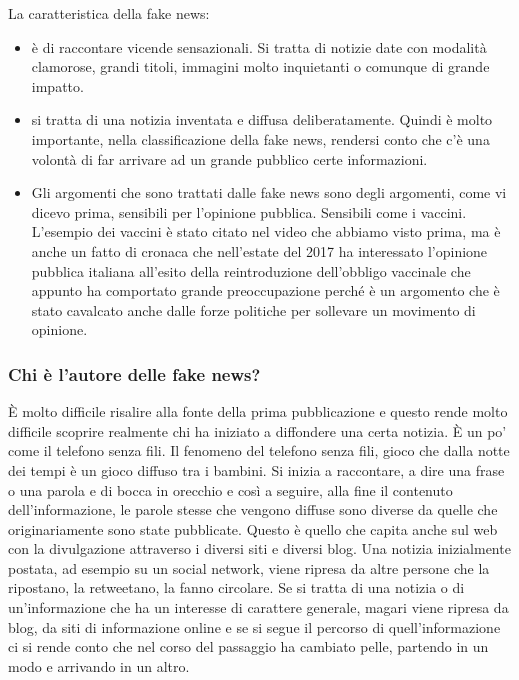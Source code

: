 La caratteristica della fake news:
\begin{itemize}
    \item è di raccontare vicende sensazionali. Si tratta di notizie date con modalità clamorose, grandi titoli, immagini molto inquietanti o comunque di grande impatto. 
    \item si tratta di una notizia inventata e diffusa deliberatamente. Quindi è molto importante, nella classificazione della fake news, rendersi conto che c'è una volontà di far arrivare ad un grande pubblico certe informazioni.
    \item Gli argomenti che sono trattati dalle fake news sono degli argomenti, come vi dicevo prima, sensibili per l'opinione pubblica. Sensibili come i vaccini. L'esempio dei vaccini è stato citato nel video che abbiamo visto prima, ma è anche un fatto di cronaca che nell'estate del 2017 ha interessato l'opinione pubblica italiana all'esito della reintroduzione dell'obbligo vaccinale che appunto ha comportato grande preoccupazione perché è un argomento che è stato cavalcato anche dalle forze politiche per sollevare un movimento di opinione.
\end{itemize}

\subsubsection{Chi è l'autore delle fake news?}

È molto difficile risalire alla fonte della prima pubblicazione e questo rende molto difficile scoprire realmente chi ha iniziato a diffondere una certa notizia. È un po' come il telefono senza fili. Il fenomeno del telefono senza fili, gioco che dalla notte dei tempi è un gioco diffuso tra i bambini. Si inizia a raccontare, a dire una frase o una parola e di bocca in orecchio e così a seguire, alla fine il contenuto dell'informazione, le parole stesse che vengono diffuse sono diverse da quelle che originariamente sono state pubblicate. Questo è quello che capita anche sul web con la divulgazione attraverso i diversi siti e diversi blog. Una notizia inizialmente postata, ad esempio su un social network, viene ripresa da altre persone che la ripostano, la retweetano, la fanno circolare. Se si tratta di una notizia o di un'informazione che ha un interesse di carattere generale, magari viene ripresa da blog, da siti di informazione online e se si segue il percorso di quell'informazione ci si rende conto che nel corso del passaggio ha cambiato pelle, partendo in un modo e arrivando in un altro.

